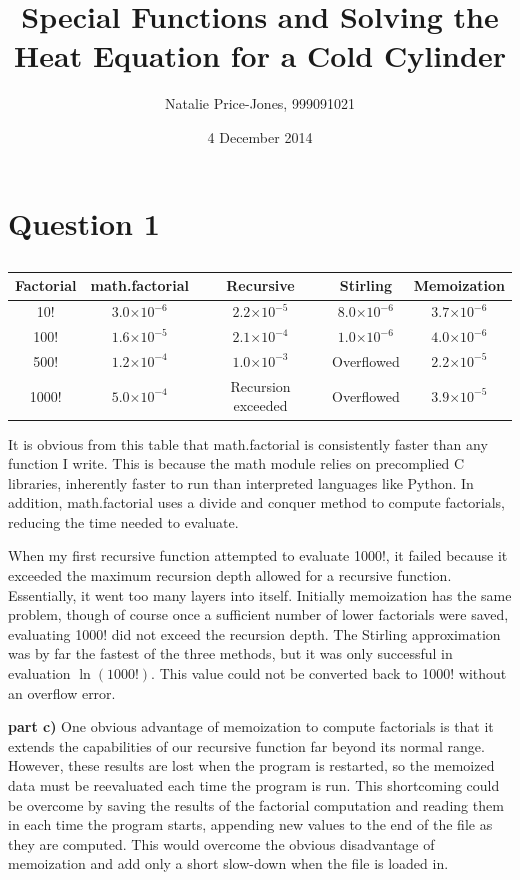 \documentclass[a4paper,12pt]{article}
\providecommand{\e}[1]{\ensuremath{\times 10^{#1}}}
\begin{document}
\onehalfspacing
\title{Special Functions and Solving the Heat Equation for a Cold Cylinder}
\author{Natalie Price-Jones, 999091021}
\date{4 December 2014}
\maketitle

\section{Question 1}
\begin{table}[H]
  \centering
  \begin{tabular}{|c||c||c||c||c|}
    \hline
    Factorial & math.factorial & Recursive & Stirling & Memoization\\
    \hline
    \hline
    10! & $3.0\e{-6}$ & $2.2\e{-5}$& $8.0\e{-6}$ & $3.7\e{-6}$\\
    \hline
    100! & $1.6\e{-5}$ & $2.1\e{-4}$ & $1.0\e{-6}$ & $4.0\e{-6}$\\
    \hline
    500! & $1.2\e{-4}$ & $1.0\e{-3}$ & Overflowed & $2.2\e{-5}$\\
    \hline
    1000! & $5.0\e{-4}$& Recursion exceeded & Overflowed & $3.9\e{-5}$\\
    \hline
  \end{tabular}
  \caption{}
\end{table}

It is obvious from this table that math.factorial is consistently faster than any function I write. This is because the math module relies on precomplied C libraries, inherently faster to run than interpreted languages like Python. In addition, math.factorial uses a divide and conquer method to compute factorials, reducing the time needed to evaluate.

When my first recursive function attempted to evaluate 1000!, it failed because it exceeded the maximum recursion depth allowed for a recursive function. Essentially, it went too many layers into itself. Initially memoization has the same problem, though of course once a sufficient number of lower factorials were saved, evaluating 1000! did not exceed the recursion depth. The Stirling approximation was by far the fastest of the three methods, but it was only successful in evaluation $\ln(1000!)$. This value could not be converted back to 1000! without an overflow error.

\textbf{part c)} One obvious advantage of memoization to compute factorials is that it extends the capabilities of our recursive function far beyond its normal range. However, these results are lost when the program is restarted, so the memoized data must be reevaluated each time the program is run. This shortcoming could be overcome by saving the results of the factorial computation and reading them in each time the program starts, appending new values to the end of the file as they are computed. This would overcome the obvious disadvantage of memoization and add only a short slow-down when the file is loaded in.
\end{document}
